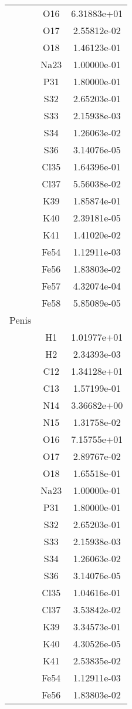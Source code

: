 \begin{centering}
\begin{longtable}{l c c}
& O16 & 6.31883e+01 \\ 
& O17 & 2.55812e-02 \\ 
& O18 & 1.46123e-01 \\ 
& Na23 & 1.00000e-01 \\ 
& P31 & 1.80000e-01 \\ 
& S32 & 2.65203e-01 \\ 
& S33 & 2.15938e-03 \\ 
& S34 & 1.26063e-02 \\ 
& S36 & 3.14076e-05 \\ 
& Cl35 & 1.64396e-01 \\ 
& Cl37 & 5.56038e-02 \\ 
& K39 & 1.85874e-01 \\ 
& K40 & 2.39181e-05 \\ 
& K41 & 1.41020e-02 \\ 
& Fe54 & 1.12911e-03 \\ 
& Fe56 & 1.83803e-02 \\ 
& Fe57 & 4.32074e-04 \\ 
& Fe58 & 5.85089e-05 \\ 
\hline
Penis & & \\
\hline
& H1 & 1.01977e+01 \\ 
& H2 & 2.34393e-03 \\ 
& C12 & 1.34128e+01 \\ 
& C13 & 1.57199e-01 \\ 
& N14 & 3.36682e+00 \\ 
& N15 & 1.31758e-02 \\ 
& O16 & 7.15755e+01 \\ 
& O17 & 2.89767e-02 \\ 
& O18 & 1.65518e-01 \\ 
& Na23 & 1.00000e-01 \\ 
& P31 & 1.80000e-01 \\ 
& S32 & 2.65203e-01 \\ 
& S33 & 2.15938e-03 \\ 
& S34 & 1.26063e-02 \\ 
& S36 & 3.14076e-05 \\ 
& Cl35 & 1.04616e-01 \\ 
& Cl37 & 3.53842e-02 \\ 
& K39 & 3.34573e-01 \\ 
& K40 & 4.30526e-05 \\ 
& K41 & 2.53835e-02 \\ 
& Fe54 & 1.12911e-03 \\ 
& Fe56 & 1.83803e-02 \\ 

\end{longtable}
\end{centering}
